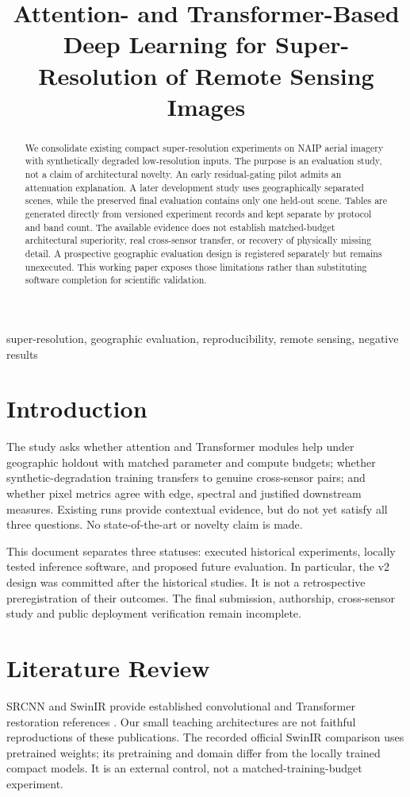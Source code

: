 \documentclass[conference]{IEEEtran}
\title{Attention- and Transformer-Based Deep Learning for Super-Resolution of Remote Sensing Images}
\author{\IEEEauthorblockN{Ahmdullah}\IEEEauthorblockA{Roll No. 264102307\\EE5302L: Introduction to Machine Learning Lab}}
\begin{document}
\maketitle
\begin{abstract}
We consolidate existing compact super-resolution experiments on NAIP aerial imagery with synthetically degraded low-resolution inputs. The purpose is an evaluation study, not a claim of architectural novelty. An early residual-gating pilot admits an attenuation explanation. A later development study uses geographically separated scenes, while the preserved final evaluation contains only one held-out scene. Tables are generated directly from versioned experiment records and kept separate by protocol and band count. The available evidence does not establish matched-budget architectural superiority, real cross-sensor transfer, or recovery of physically missing detail. A prospective geographic evaluation design is registered separately but remains unexecuted. This working paper exposes those limitations rather than substituting software completion for scientific validation.
\end{abstract}
\begin{IEEEkeywords}
super-resolution, geographic evaluation, reproducibility, remote sensing, negative results
\end{IEEEkeywords}

\section{Introduction}
The study asks whether attention and Transformer modules help under geographic holdout with matched parameter and compute budgets; whether synthetic-degradation training transfers to genuine cross-sensor pairs; and whether pixel metrics agree with edge, spectral and justified downstream measures. Existing runs provide contextual evidence, but do not yet satisfy all three questions. No state-of-the-art or novelty claim is made.

This document separates three statuses: executed historical experiments, locally tested inference software, and proposed future evaluation. In particular, the v2 design was committed after the historical studies. It is not a retrospective preregistration of their outcomes. The final submission, authorship, cross-sensor study and public deployment verification remain incomplete.


\section{Literature Review}

SRCNN and SwinIR provide established convolutional and Transformer restoration references \cite{dong2014srcnn,liang2021swinir}. Our small teaching architectures are not faithful reproductions of these publications. The recorded official SwinIR comparison uses pretrained weights; its pretraining and domain differ from the locally trained compact models. It is an external control, not a matched-training-budget experiment.
\end{document}

